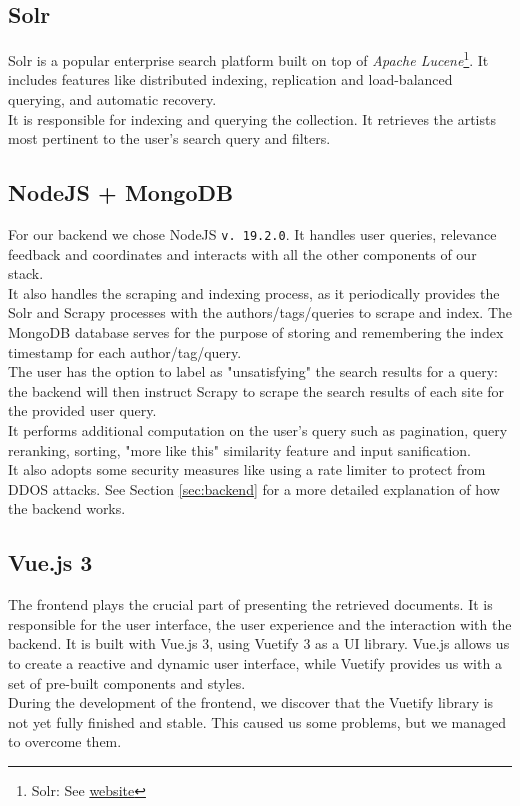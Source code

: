 \documentclass[tikz,14pt]{article}
\begin{document}
\subsection{Solr} \label{sec:solr}
Solr is a popular enterprise search platform built on top of \textit{Apache Lucene}\footnote{Solr: See \href{https://solr.apache.org/guide/solr/9_0/index.html}{website}}. It includes features like distributed indexing, replication and load-balanced querying, and automatic recovery.\\
It is responsible for indexing and querying the collection. It retrieves the artists most pertinent to the user's search query and filters.

\subsection{NodeJS + MongoDB} \label{sec:node-mongo}
For our backend we chose NodeJS \verb|v. 19.2.0|. It handles user queries, relevance feedback and coordinates and interacts with all the other components of our stack.\\
It also handles the scraping and indexing process, as it periodically provides the Solr and Scrapy processes with the authors/tags/queries to scrape and index. The MongoDB database serves for the purpose of storing and remembering the index timestamp for each author/tag/query.\\
The user has the option to label as "unsatisfying" the search results for a query: the backend will then instruct Scrapy to scrape the search results of each site for the provided user query.\\
It performs additional computation on the user's query such as pagination, query reranking, sorting, "more like this" similarity feature and input sanification.\\ It also adopts some security measures like using a rate limiter to protect from DDOS attacks. See Section \ref{sec:backend} for a more detailed explanation of how the backend works.

\subsection{Vue.js 3} \label{sec:vuejs}
The frontend plays the crucial part of presenting the retrieved documents. 
It is responsible for the user interface, the user experience and the interaction with the backend. 
It is built with Vue.js 3, using Vuetify 3 as a UI library. Vue.js allows us to create a reactive and dynamic user interface, while Vuetify provides us with a set of pre-built components and styles.\\
During the development of the frontend, we discover that the Vuetify library is not yet fully finished and stable. This caused us some problems, but we managed to overcome them.\\
\end{document}
